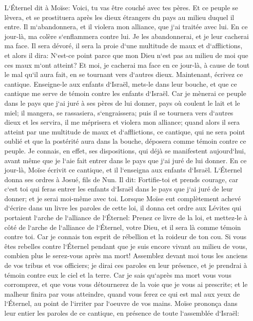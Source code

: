 \verse L`Éternel dit à Moïse: Voici, tu vas être couché avec tes pères. Et ce peuple se lèvera, et se prostituera après les dieux étrangers du pays au milieu duquel il entre. Il m`abandonnera, et il violera mon alliance, que j`ai traitée avec lui. 
\verse En ce jour-là, ma colère s`enflammera contre lui. Je les abandonnerai, et je leur cacherai ma face. Il sera dévoré, il sera la proie d`une multitude de maux et d`afflictions, et alors il dira: N`est-ce point parce que mon Dieu n`est pas au milieu de moi que ces maux m`ont atteint? 
\verse Et moi, je cacherai ma face en ce jour-là, à cause de tout le mal qu`il aura fait, en se tournant vers d`autres dieux. 
\verse Maintenant, écrivez ce cantique. Enseigne-le aux enfants d`Israël, mets-le dans leur bouche, et que ce cantique me serve de témoin contre les enfants d`Israël. 
\verse Car je mènerai ce peuple dans le pays que j`ai juré à ses pères de lui donner, pays où coulent le lait et le miel; il mangera, se rassasiera, s`engraissera; puis il se tournera vers d`autres dieux et les servira, il me méprisera et violera mon alliance; 
\verse quand alors il sera atteint par une multitude de maux et d`afflictions, ce cantique, qui ne sera point oublié et que la postérité aura dans la bouche, déposera comme témoin contre ce peuple. Je connais, en effet, ses dispositions, qui déjà se manifestent aujourd`hui, avant même que je l`aie fait entrer dans le pays que j`ai juré de lui donner. 
\verse En ce jour-là, Moïse écrivit ce cantique, et il l`enseigna aux enfants d`Israël. 
\verse L`Éternel donna ses ordres à Josué, fils de Nun. Il dit: Fortifie-toi et prends courage, car c`est toi qui feras entrer les enfants d`Israël dans le pays que j`ai juré de leur donner; et je serai moi-même avec toi. 
\verse Lorsque Moïse eut complètement achevé d`écrire dans un livre les paroles de cette loi, 
\verse il donna cet ordre aux Lévites qui portaient l`arche de l`alliance de l`Éternel: 
\verse Prenez ce livre de la loi, et mettez-le à côté de l`arche de l`alliance de l`Éternel, votre Dieu, et il sera là comme témoin contre toi. 
\verse Car je connais ton esprit de rébellion et la roideur de ton cou. Si vous êtes rebelles contre l`Éternel pendant que je suis encore vivant au milieu de vous, combien plus le serez-vous après ma mort! 
\verse Assemblez devant moi tous les anciens de vos tribus et vos officiers; je dirai ces paroles en leur présence, et je prendrai à témoin contre eux le ciel et la terre. 
\verse Car je sais qu`après ma mort vous vous corromprez, et que vous vous détournerez de la voie que je vous ai prescrite; et le malheur finira par vous atteindre, quand vous ferez ce qui est mal aux yeux de l`Éternel, au point de l`irriter par l`oeuvre de vos mains. 
\verse Moïse prononça dans leur entier les paroles de ce cantique, en présence de toute l`assemblée d`Israël: 

